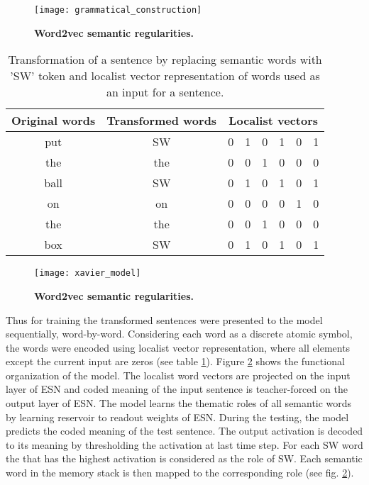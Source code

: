 \begin{figure}[hbtp]
\centering
\texttt{[image: grammatical\_construction]}
\caption[Word2vec semantic regularities]{\textbf{Word2vec semantic regularities.}} 
\label{fig:tra_gc}
\end{figure}

\begin{table}[hbtp]
\centering
\caption[Localist vector representation of sentence]{Transformation of a sentence by replacing semantic words with 'SW' token and localist vector representation of words used as an input for a sentence.}
\begin{tabular}{|c|c|c|c|c|c|c|c|}
\hline
\textbf{Original words} & \textbf{Transformed words}  & \multicolumn{6}{c|}{\textbf{Localist vectors}} \\ \hline
put		&	SW     & 0   & 1  & 0  & 1  & 0  & 1  \\ \hline
the		&	the    & 0   & 0  & 1  & 0  & 0  & 0  \\ \hline
ball	&	SW     & 0   & 1  & 0  & 1  & 0  & 1  \\ \hline
on		&	on     & 0   & 0  & 0  & 0  & 1  & 0  \\ \hline
the		&	the    & 0   & 0  & 1  & 0  & 0  & 0  \\ \hline
box		&	SW     & 0   & 1  & 0  & 1  & 0  & 1  \\ \hline
\end{tabular}
\label{tab:localist_representation}
\end{table}

\begin{figure}[hbtp]
\centering
\texttt{[image: xavier\_model]}
\caption[Word2vec semantic regularities]{\textbf{Word2vec semantic regularities.}} 
\label{fig:xavier_model}
\end{figure}

Thus for training the transformed sentences were presented to the model sequentially, word-by-word. Considering each word as a discrete atomic symbol, the words were encoded using localist vector representation, where all elements except the current input are zeros (see table \ref{tab:localist_representation}). Figure \ref{fig:xavier_model} shows the functional organization of the model. The localist word vectors are projected on the input layer of ESN and coded meaning of the input sentence is teacher-forced on the output layer of ESN. The model learns the thematic roles of all semantic words by learning reservoir to readout weights of ESN. During the testing, the model predicts the coded meaning of the test sentence. The output activation is decoded to its meaning by thresholding the activation at last time step. For each SW word the that has the highest activation is considered as the role of SW. Each semantic word in the memory stack is then mapped to the corresponding role (see fig. \ref{fig:xavier_model}).

